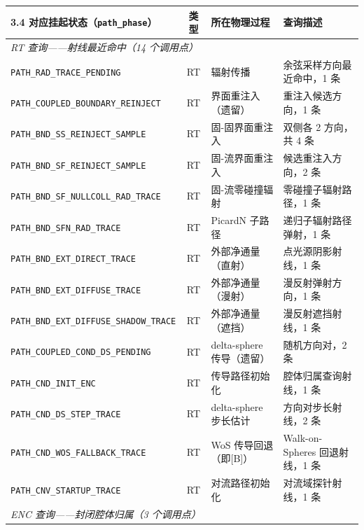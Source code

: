 \begin{table}[htbp]
  \centering
  \label{tab:suspension-points}
  \small
  \begin{tabular}{p{4.6cm}cll}
    \toprule
    3.4 对应挂起状态（\texttt{path\_phase}） & 类型 & 所在物理过程 & 查询描述 \\
    \midrule
    \multicolumn{4}{l}{\textit{RT 查询——射线最近命中（14 个调用点）}} \\
    \midrule
    \texttt{PATH\_RAD\_TRACE\_PENDING}         & RT & 辐射传播       & 余弦采样方向最近命中，1 条 \\
    \texttt{PATH\_COUPLED\_BOUNDARY\_REINJECT} & RT & 界面重注入（遗留）& 重注入候选方向，1 条 \\
    \texttt{PATH\_BND\_SS\_REINJECT\_SAMPLE}   & RT & 固-固界面重注入  & 双侧各 2 方向，共 4 条 \\
    \texttt{PATH\_BND\_SF\_REINJECT\_SAMPLE}   & RT & 固-流界面重注入  & 候选重注入方向，2 条 \\
    \texttt{PATH\_BND\_SF\_NULLCOLL\_RAD\_TRACE} & RT & 固-流零碰撞辐射  & 零碰撞子辐射路径，1 条 \\
    \texttt{PATH\_BND\_SFN\_RAD\_TRACE}        & RT & PicardN 子路径  & 递归子辐射路径弹射，1 条 \\
    \texttt{PATH\_BND\_EXT\_DIRECT\_TRACE}     & RT & 外部净通量（直射）& 点光源阴影射线，1 条 \\
    \texttt{PATH\_BND\_EXT\_DIFFUSE\_TRACE}    & RT & 外部净通量（漫射）& 漫反射弹射方向，1 条 \\
    \texttt{PATH\_BND\_EXT\_DIFFUSE\_SHADOW\_TRACE} & RT & 外部净通量（遮挡）& 漫反射遮挡射线，1 条 \\
    \texttt{PATH\_COUPLED\_COND\_DS\_PENDING}  & RT & delta-sphere 传导（遗留）& 随机方向对，2 条 \\
    \texttt{PATH\_CND\_INIT\_ENC}              & RT & 传导路径初始化   & 腔体归属查询射线，1 条 \\
    \texttt{PATH\_CND\_DS\_STEP\_TRACE}        & RT & delta-sphere 步长估计 & 方向对步长射线，2 条 \\
    \texttt{PATH\_CND\_WOS\_FALLBACK\_TRACE}   & RT & WoS 传导回退（即[B]）& Walk-on-Spheres 回退射线，1 条 \\
    \texttt{PATH\_CNV\_STARTUP\_TRACE}         & RT & 对流路径初始化   & 对流域探针射线，1 条 \\
    \midrule
    \multicolumn{4}{l}{\textit{ENC 查询——封闭腔体归属（3 个调用点）}} \\

\end{tabular}
\end{table}
